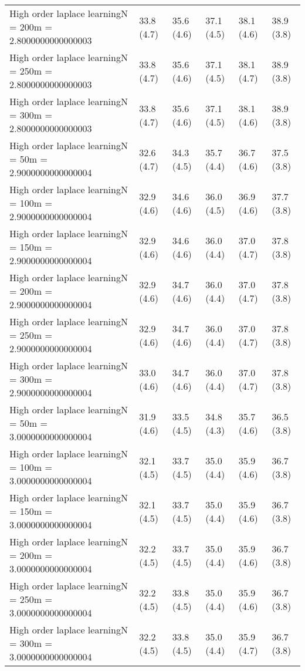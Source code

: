 \documentclass{article}
\begin{document}
\begin{table*}[t!]
\begin{center}
\begin{small}
\begin{sc}
\begin{tabular}{llllll}
High order laplace learningN = 200m = 2.8000000000000003&33.8 (4.7)      &35.6 (4.6)      &37.1 (4.5)      &38.1 (4.6)      &38.9 (3.8)      \\
High order laplace learningN = 250m = 2.8000000000000003&33.8 (4.7)      &35.6 (4.6)      &37.1 (4.5)      &38.1 (4.7)      &38.9 (3.8)      \\
High order laplace learningN = 300m = 2.8000000000000003&33.8 (4.7)      &35.6 (4.6)      &37.1 (4.5)      &38.1 (4.6)      &38.9 (3.8)      \\
High order laplace learningN = 50m = 2.9000000000000004&32.6 (4.7)      &34.3 (4.5)      &35.7 (4.4)      &36.7 (4.6)      &37.5 (3.8)      \\
High order laplace learningN = 100m = 2.9000000000000004&32.9 (4.6)      &34.6 (4.6)      &36.0 (4.5)      &36.9 (4.6)      &37.7 (3.8)      \\
High order laplace learningN = 150m = 2.9000000000000004&32.9 (4.6)      &34.6 (4.6)      &36.0 (4.4)      &37.0 (4.7)      &37.8 (3.8)      \\
High order laplace learningN = 200m = 2.9000000000000004&32.9 (4.6)      &34.7 (4.6)      &36.0 (4.4)      &37.0 (4.7)      &37.8 (3.8)      \\
High order laplace learningN = 250m = 2.9000000000000004&32.9 (4.6)      &34.7 (4.6)      &36.0 (4.4)      &37.0 (4.7)      &37.8 (3.8)      \\
High order laplace learningN = 300m = 2.9000000000000004&33.0 (4.6)      &34.7 (4.6)      &36.0 (4.4)      &37.0 (4.7)      &37.8 (3.8)      \\
High order laplace learningN = 50m = 3.0000000000000004&31.9 (4.6)      &33.5 (4.5)      &34.8 (4.3)      &35.7 (4.6)      &36.5 (3.8)      \\
High order laplace learningN = 100m = 3.0000000000000004&32.1 (4.5)      &33.7 (4.5)      &35.0 (4.4)      &35.9 (4.6)      &36.7 (3.8)      \\
High order laplace learningN = 150m = 3.0000000000000004&32.1 (4.5)      &33.7 (4.5)      &35.0 (4.4)      &35.9 (4.6)      &36.7 (3.8)      \\
High order laplace learningN = 200m = 3.0000000000000004&32.2 (4.5)      &33.7 (4.5)      &35.0 (4.4)      &35.9 (4.6)      &36.7 (3.8)      \\
High order laplace learningN = 250m = 3.0000000000000004&32.2 (4.5)      &33.8 (4.5)      &35.0 (4.4)      &35.9 (4.6)      &36.7 (3.8)      \\
High order laplace learningN = 300m = 3.0000000000000004&32.2 (4.5)      &33.8 (4.5)      &35.0 (4.4)      &35.9 (4.7)      &36.7 (3.8)      \\

\end{tabular}
\end{sc}
\end{small}
\end{center}
\end{table*}
\end{document}
